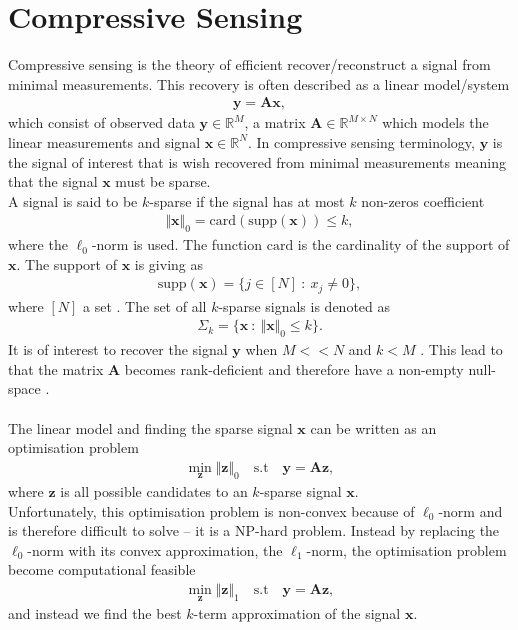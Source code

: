 \section{Compressive Sensing}\label{sec:CS}
Compressive sensing is the theory of efficient recover/reconstruct a signal from minimal measurements. This recovery is often described as a linear model/system 
\begin{align*}
\mathbf{y} = \mathbf{Ax},
\end{align*}
which consist of observed data $\mathbf{y} \in \mathbb{R}^M$, a matrix $\mathbf{A} \in \mathbb{R}^{M \times N}$ which models the linear measurements and signal $\mathbf{x} \in \mathbb{R}^N$. In compressive sensing terminology, $\mathbf{y}$ is the signal of interest that is wish recovered from minimal measurements meaning that the signal $\mathbf{x}$ must be sparse.
\\
A signal is said to be $k$-sparse if the signal has at most $k$ non-zeros coefficient
\begin{align*}
\Vert \mathbf{x} \Vert_0 = \text{card}(\text{supp}(\mathbf{x})) \leq k,
\end{align*}
where the $\ell_0$-norm is used. The function $\text{card}$ is the cardinality of the support of $\mathbf{x}$. The support of $\mathbf{x}$ is giving as
\begin{align*}
\text{supp}(\mathbf{x}) = \{ j \in [N] \ : \ x_j \neq 0 \},
\end{align*} 
where $[N]$ a set \cite[p. 41]{FR}. The set of all $k$-sparse signals is denoted as
\begin{align*}
\Sigma_k = \{ \mathbf{x} \ : \ \Vert \mathbf{x} \Vert_0 \leq k \}.
\end{align*}
It is of interest to recover the signal $\mathbf{y}$ when $M << N$ and $k < M$ \cite[p. 8]{CS}. This lead to that the matrix $\mathbf{A}$ becomes rank-deficient and therefore have a non-empty null-space \cite[p. ix]{CS}.
\\ \\
The linear model and finding the sparse signal $\mathbf{x}$ can be written as an optimisation problem
\begin{align*}
\min_{\mathbf{z}} \Vert \mathbf{z} \Vert_0 \quad \text{s.t} \quad \mathbf{y} = \mathbf{Az},
\end{align*}
where $\mathbf{z}$ is all possible candidates to an $k$-sparse signal $\mathbf{x}$.
\\
Unfortunately, this optimisation problem is non-convex because of $\ell_0$-norm and is therefore difficult to solve -- it is a NP-hard problem. Instead by replacing the $\ell_0$-norm with its convex approximation, the $\ell_1$-norm, the optimisation problem become computational feasible \cite[p. 27]{CS}
\begin{align}\label{eq:p1}
\min_{\mathbf{z}} \Vert \mathbf{z} \Vert_1 \quad \text{s.t} \quad \mathbf{y} = \mathbf{Az},
\end{align} 
and instead we find the best $k$-term approximation of the signal $\mathbf{x}$.

